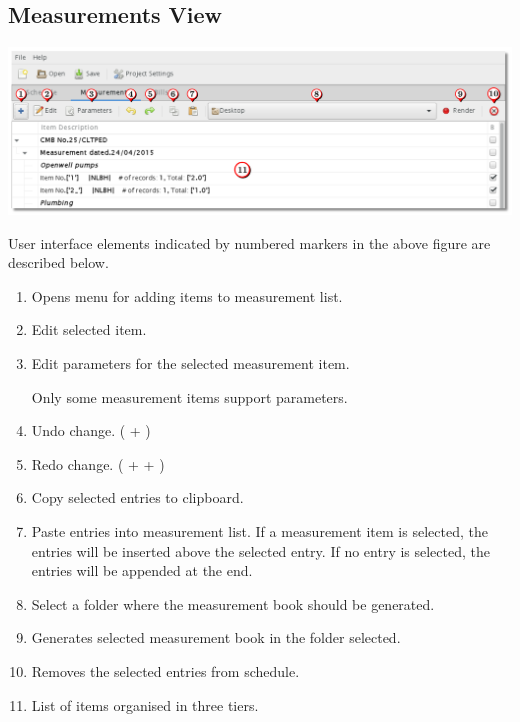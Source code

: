 \documentclass[twoside,a4paper]{refart}
\newenvironment{noteblock}[1]%
{\begin{mdframed}[topline=false,bottomline=false, rightline=false,
		linewidth=2pt, frametitle={#1}]}%
		{\end{mdframed}}
\begin{document}
	 \subsection{Measurements View}
	 
	 \begin{maxipage}
	 	\includegraphics[width=1\linewidth]{screenshots/window_meas.png}
	 \end{maxipage}
	 
	 User interface elements indicated by numbered markers in the above figure are described below.
	 
	 \begin{enumerate}
	 	\item Opens menu for adding items to measurement list.
	 	\item Edit selected item.
	 	\item Edit parameters for the selected measurement item. \\
	 	\begin{noteblock}{Note:}
	 		Only some measurement items support parameters.
	 	\end{noteblock}
	 	\item Undo change. ( + )
	 	\item Redo change. ( +  + )	 
	 	\item Copy selected entries to clipboard.
	 	\item Paste entries into measurement list. If a measurement item is selected, the entries will be inserted above the selected entry. If no entry is selected, the entries will be appended at the end.
	 	\item Select a folder where the measurement book should be generated.
	 	\item Generates selected measurement book in the folder selected.
	 	\item Removes the selected entries from schedule.
	 	\item List of items organised in three tiers.
	 \end{enumerate}
	 
\end{document}
